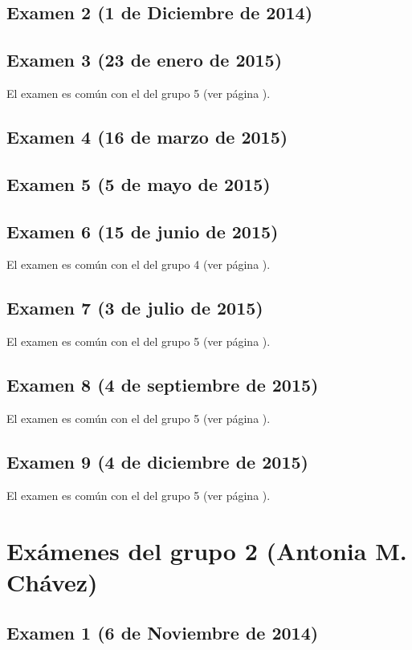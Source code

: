 \documentclass[a4paper,12pt,twoside]{book}
\begin{document}
\subsection{Examen 2 (1 de Diciembre de 2014)}
\subsection{Examen 3 (23 de enero de 2015)}
El examen es común con el del grupo 5 (ver página \pageref{examen_14_15_5_3}).
\subsection{Examen 4 (16 de marzo de 2015)}
\subsection{Examen 5 (5 de mayo de 2015)}
\subsection{Examen 6 (15 de junio de 2015)}
El examen es común con el del grupo 4 (ver página \pageref{examen_14_15_4_6}).
\subsection{Examen 7 (3 de julio de 2015)}
El examen es común con el del grupo 5 (ver página \pageref{examen_14_15_5_7}).
\subsection{Examen 8 (4 de septiembre de 2015)}
El examen es común con el del grupo 5 (ver página \pageref{examen_14_15_5_8}).
\subsection{Examen 9 (4 de diciembre de 2015)}
El examen es común con el del grupo 5 (ver página \pageref{examen_14_15_5_9}).

\section{Exámenes del grupo 2 (Antonia M. Chávez)}
\subsection{Examen 1 (6 de Noviembre de 2014)}
\end{document}
